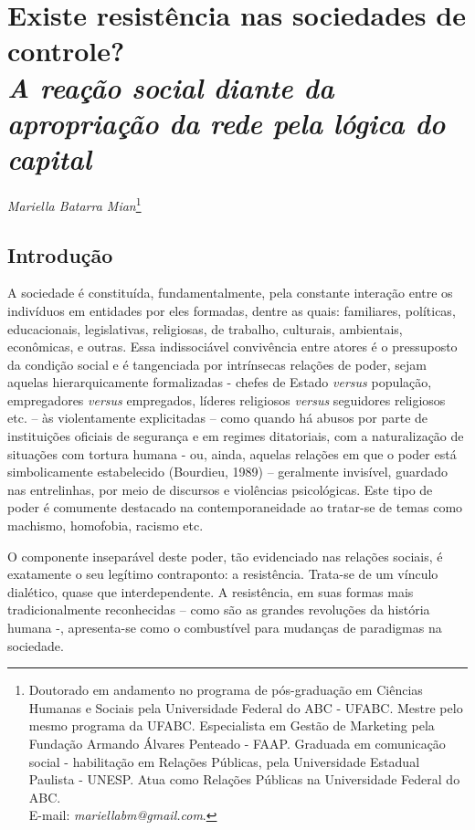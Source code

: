 \chapter{Existe resistência nas sociedades de controle?\\ \emph{\small{A reação social diante da apropriação da rede pela lógica do capital}}}

\begin{flushright}
\emph{Mariella Batarra Mian}\footnote{Doutorado em andamento no programa de
  pós-graduação em Ciências Humanas e Sociais pela Universidade Federal
  do ABC - UFABC. Mestre pelo mesmo programa da UFABC. Especialista em
  Gestão de Marketing pela Fundação Armando Álvares Penteado - FAAP.
  Graduada em comunicação social - habilitação em Relações Públicas,
  pela Universidade Estadual Paulista - UNESP. Atua como Relações
  Públicas na Universidade Federal do ABC.\\
  E-mail: \emph{mariellabm@gmail.com}.}
\end{flushright}

\section{Introdução}

A sociedade é constituída, fundamentalmente, pela constante interação
entre os indivíduos em entidades por eles formadas, dentre as quais:
familiares, políticas, educacionais, legislativas, religiosas, de
trabalho, culturais, ambientais, econômicas, e outras. Essa
indissociável convivência entre atores é o pressuposto da condição
social e é tangenciada por intrínsecas relações de poder, sejam aquelas
hierarquicamente formalizadas - chefes de Estado \emph{versus}
população, empregadores \emph{versus} empregados, líderes religiosos
\emph{versus} seguidores religiosos etc. -- às violentamente
explicitadas -- como quando há abusos por parte de instituições oficiais
de segurança e em regimes ditatoriais, com a naturalização de situações
com tortura humana - ou, ainda, aquelas relações em que o poder está
simbolicamente estabelecido (Bourdieu, 1989) -- geralmente invisível,
guardado nas entrelinhas, por meio de discursos e violências
psicológicas. Este tipo de poder é comumente destacado na
contemporaneidade ao tratar-se de temas como machismo, homofobia,
racismo etc.

O componente inseparável deste poder, tão evidenciado nas relações
sociais, é exatamente o seu legítimo contraponto: a resistência.
Trata-se de um vínculo dialético, quase que interdependente. A
resistência, em suas formas mais tradicionalmente reconhecidas -- como
são as grandes revoluções da história humana -, apresenta-se como o
combustível para mudanças de paradigmas na sociedade.

